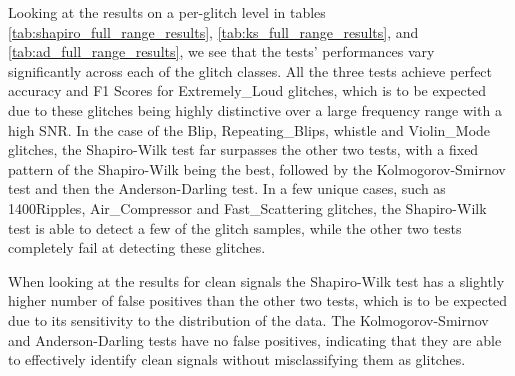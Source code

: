 \documentclass[12pt]{article}
\begin{document}
\noindent Looking at the results on a per-glitch level in tables \ref{tab:shapiro_full_range_results}, \ref{tab:ks_full_range_results}, and \ref{tab:ad_full_range_results}, we see that the tests' performances vary significantly across each of the glitch classes. All the three tests achieve perfect accuracy and F1 Scores for Extremely\_Loud glitches, which is to be expected due to these glitches being highly distinctive over a large frequency range with a high SNR. In the case of the Blip, Repeating\_Blips, whistle and Violin\_Mode glitches, the Shapiro-Wilk test far surpasses the other two tests, with a fixed pattern of the Shapiro-Wilk being the best, followed by the Kolmogorov-Smirnov test and then the Anderson-Darling test. In a few unique cases, such as 1400Ripples, Air\_Compressor and Fast\_Scattering glitches, the Shapiro-Wilk test is able to detect a few of the glitch samples, while the other two tests completely fail at detecting these glitches.

\medskip
\noindent When looking at the results for clean signals the Shapiro-Wilk test has a slightly higher number of false positives than the other two tests, which is to be expected due to its sensitivity to the distribution of the data. The Kolmogorov-Smirnov and Anderson-Darling tests have no false positives, indicating that they are able to effectively identify clean signals without misclassifying them as glitches.
\end{document}
